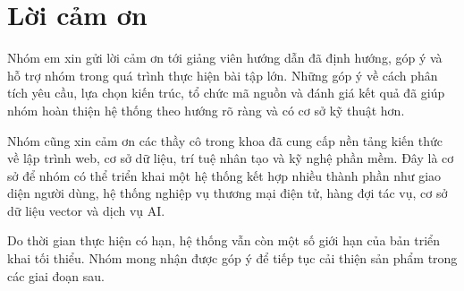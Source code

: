 \chapter*{Lời cảm ơn}
{}

Nhóm em xin gửi lời cảm ơn tới giảng viên hướng dẫn đã định hướng, góp ý và hỗ trợ nhóm trong quá trình thực hiện bài tập lớn. Những góp ý về cách phân tích yêu cầu, lựa chọn kiến trúc, tổ chức mã nguồn và đánh giá kết quả đã giúp nhóm hoàn thiện hệ thống theo hướng rõ ràng và có cơ sở kỹ thuật hơn.

\medskip

Nhóm cũng xin cảm ơn các thầy cô trong khoa đã cung cấp nền tảng kiến thức về lập trình web, cơ sở dữ liệu, trí tuệ nhân tạo và kỹ nghệ phần mềm. Đây là cơ sở để nhóm có thể triển khai một hệ thống kết hợp nhiều thành phần như giao diện người dùng, hệ thống nghiệp vụ thương mại điện tử, hàng đợi tác vụ, cơ sở dữ liệu vector và dịch vụ AI.

\medskip

Do thời gian thực hiện có hạn, hệ thống vẫn còn một số giới hạn của bản triển khai tối thiểu. Nhóm mong nhận được góp ý để tiếp tục cải thiện sản phẩm trong các giai đoạn sau.

\clearpage
